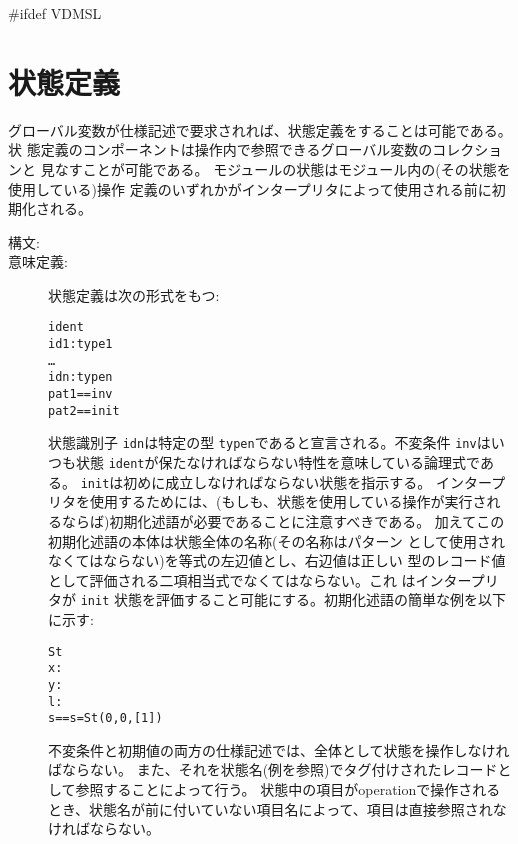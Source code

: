 \documentclass[\pformat,12pt]{jarticle}
\begin{document}
#ifdef VDMSL
\section{状態定義}\label{statedef}

グローバル変数が仕様記述で要求されれば、状態定義をすることは可能である。状
態定義のコンポーネントは操作内で参照できるグローバル変数のコレクションと
見なすことが可能である。
モジュールの状態はモジュール内の(その状態を使用している)操作
定義のいずれかがインタープリタによって使用される前に初期化される。

\begin{description}
\item[構文:]




\item[意味定義:] 状態定義は次の形式をもつ:
  \begin{alltt}
     ident 
      id1 : type1
      \ldots
      idn : typen
      pat1 == inv
     pat2 == init
  \end{alltt}
  状態識別子 {\tt idn}は特定の型 {\tt typen}であると宣言される。不変条件 {\tt inv}はいつも状態 {\tt ident}が保たなければならない特性を意味している論理式である。
  {\tt init}は初めに成立しなければならない状態を指示する。
  インタープリタを使用するためには、(もしも、状態を使用している操作が実行されるならば)初期化述語が必要であることに注意すべきである。
  加えてこの初期化述語の本体は状態全体の名称(その名称はパターン
  として使用されなくてはならない)を等式の左辺値とし、右辺値は正しい
  型のレコード値として評価される二項相当式でなくてはならない。これ
  はインタープリタが {\tt init} 状態を評価すること可能にする。初期化述語の簡単な例を以下に示す:

  \begin{alltt}
   St 
    x:
    y:
    l:
   s == s = St(0,0,[1])
  \end{alltt}

  不変条件と初期値の両方の仕様記述では、全体として状態を操作しなければならない。
  また、それを状態名(例を参照)でタグ付けされたレコードとして参照することによって行う。
  状態中の項目がoperationで操作されるとき、状態名が前に付いていない項目名によって、項目は直接参照されなければならない。




\end{description}
\end{document}
